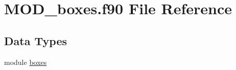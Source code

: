 \hypertarget{MOD__boxes_8f90}{\section{M\-O\-D\-\_\-boxes.\-f90 File Reference}
\label{MOD__boxes_8f90}
}
\subsection*{Data Types}
\begin{DoxyCompactItemize}
\item 
module \hyperlink{classboxes}{boxes}
\end{DoxyCompactItemize}
